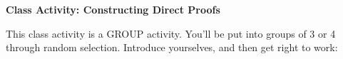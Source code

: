 \documentclass[11pt]{article}
\begin{document}
	
	\thispagestyle{empty}
	\renewcommand{\headrulewidth}{0.0pt}
	\thispagestyle{fancy}
	\lfoot{}
	\cfoot{}
	\rfoot{}	
	
	\vspace*{0in}

		\begin{center}
			\begin{large}
			\textbf{Class Activity: Constructing Direct Proofs} \\
			\end{large}
		\end{center}
		
This class activity is a GROUP activity. You'll be put into groups of 3 or 4 through random selection. Introduce yourselves, and then get right to work: 
\end{document}
